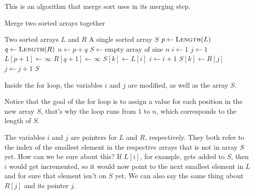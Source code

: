 \begin{example}
    This is an algorithm that merge sort uses in its merging step.
    \begin{algorithm}[H]
        \caption{Merge two sorted arrays together}
        \begin{algorithmic}[1]
            \Require Two sorted arrays $L$ and $R$
            \Ensure A single sorted array $S$
                \State $p \gets \text{\Call{Length}{$L$}}$
                \State $q \gets \text{\Call{Length}{$R$}}$
                \State $n \gets p + q$
                \State $S \gets \text{empty array of size $n$}$
                \State $i \gets 1$
                \State $j \gets 1$
                \State $L[p+1] \gets \infty$
                \State $R[q+1] \gets \infty$
                        \State $S[k] \gets L[i]$
                        \State $i \gets i+1$
                    \Else
                        \State $S[k] \gets R[j]$
                        \State $j \gets j+1$
                    \EndIf
                \EndFor
                \Return $S$
            \EndFunction
        \end{algorithmic}
    \end{algorithm}

    Inside the for loop, the variables $i$ and $j$ are modified, as well as the array $S$. %

    Notice that the goal of the for loop is to assign a value for each position in the new array $S$, that's why the loop runs from $1$ to $n$, which corresponds to the length of $S$. 

    The variables $i$ and $j$ are pointers for $L$ and $R$, respectively. They both refer to the index of the smallest element in the respective arrays that is not in array $S$ yet. How can we be sure about this? If $L[i]$, for example, gets added to $S$, then $i$ would get incremented, so it would now point to the next smallest element in $L$ and for sure that element isn't on $S$ yet. We can also say the same thing about $R[j]$ and its pointer $j$.

\end{example}

